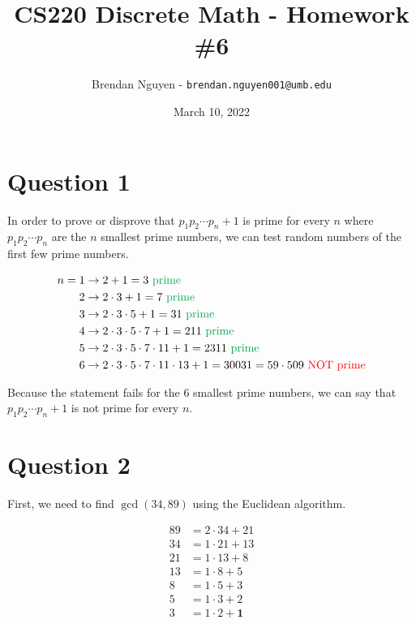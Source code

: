 \documentclass[11pt]{article}
\title{CS220 Discrete Math - Homework \#6}
\author{Brendan Nguyen - \texttt{brendan.nguyen001@umb.edu}}
\date{March 10, 2022}
\begin{document}
\maketitle

\section*{Question 1}
In order to prove or disprove that $p_{1}p_{2} \cdots p_n + 1$ is prime for every $n$ where $p_{1}p_{2} \cdots p_n$ are the $n$ smallest prime numbers, we can test random numbers of the first few prime numbers.

\begin{align*}
    n = 1 &\to 2 + 1 = 3 \text{ \textcolor{Green}{prime}}\\
    2 &\to 2 \cdot 3 + 1 = 7 \text{ \textcolor{Green}{prime}}\\
    3 &\to 2 \cdot 3 \cdot 5 + 1 = 31 \text{ \textcolor{Green}{prime}}\\
    4 &\to 2 \cdot 3 \cdot 5 \cdot 7 + 1 = 211 \text{ \textcolor{Green}{prime}}\\
    5 &\to 2 \cdot 3 \cdot 5 \cdot 7 \cdot 11 + 1 = 2311 \text{ \textcolor{Green}{prime}}\\
    6 &\to 2 \cdot 3 \cdot 5 \cdot 7 \cdot 11 \cdot 13 + 1 = 30031 = 59 \cdot 509 \text{ \textcolor{red}{NOT prime}}\\
\end{align*}

Because the statement fails for the 6 smallest prime numbers, we can say that $p_{1}p_{2} \cdots p_n + 1$ is not prime for every $n$.

\section*{Question 2}
First, we need to find $\gcd(34, 89)$ using the Euclidean algorithm.

\begin{align*}
    89 &= 2 \cdot 34 + 21\\
    34 &= 1 \cdot 21 + 13\\
    21 &= 1 \cdot 13 + 8\\
    13 &= 1 \cdot 8 + 5\\
    8 &= 1 \cdot 5 + 3\\
    5 &= 1 \cdot 3 + 2\\
    3 &= 1 \cdot 2 + \boxed{\mathbf{1}}\\
\end{align*}
\end{document}
